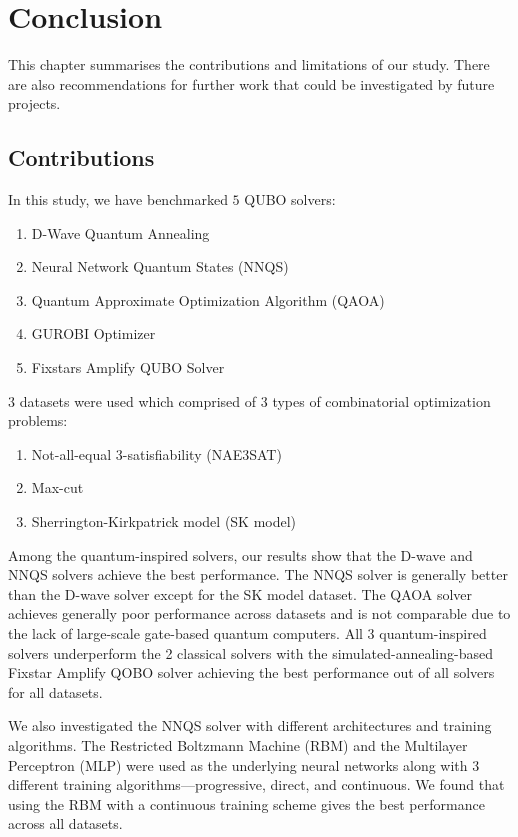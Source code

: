 \chapter{Conclusion}

This chapter summarises the contributions and limitations of our study. There are also recommendations for further work that could be investigated by future projects.

\section{Contributions}
In this study, we have benchmarked $5$ QUBO solvers:
\begin{enumerate}
    \item D-Wave Quantum Annealing
    \item Neural Network Quantum States (NNQS)
    \item Quantum Approximate Optimization Algorithm (QAOA)
    \item GUROBI Optimizer
    \item Fixstars Amplify QUBO Solver
\end{enumerate}
$3$ datasets were used which comprised of $3$ types of combinatorial optimization problems:
\begin{enumerate}
    \item Not-all-equal 3-satisfiability (NAE3SAT)
    \item Max-cut
    \item Sherrington-Kirkpatrick model (SK model)
\end{enumerate}
Among the quantum-inspired solvers, our results show that the D-wave and NNQS solvers achieve the best performance. The NNQS solver is generally better than the D-wave solver except for the SK model dataset. The QAOA solver achieves generally poor performance across datasets and is not comparable due to the lack of large-scale gate-based quantum computers. All 3 quantum-inspired solvers underperform the 2 classical solvers with the simulated-annealing-based Fixstar Amplify QOBO solver achieving the best performance out of all solvers for all datasets.

We also investigated the NNQS solver with different architectures and training algorithms. The Restricted Boltzmann Machine (RBM) and the Multilayer Perceptron (MLP) were used as the underlying neural networks along with $3$ different training algorithms---progressive, direct, and continuous. We found that using the RBM with a continuous training scheme gives the best performance across all datasets.

